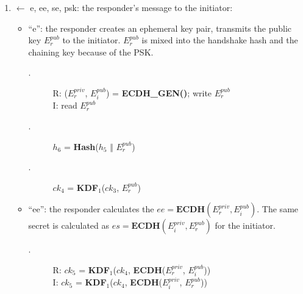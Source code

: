   \begin{enumerate} [start = \value{msg}]
    \item $\leftarrow$ e, ee, se, psk: the responder's message to the initiator:
    \addtocounter{msg}{1}
    \begin{itemize}
      \item ``e'': the responder creates an ephemeral key pair, transmits the public key
      $E^{pub}_r$ to the initiator. $E^{pub}_r$ is mixed into the handshake hash and the chaining
      key because of the PSK.
      \begin{center}
        \begin{varwidth}{\textwidth}
          \begin{description}
          \item[\textnormal{}.] R: ($E^{priv}_r$, $E^{pub}_i$) = \textbf{ECDH{\_}GEN()}; write $E^{pub}_r$ \\
                I:  read $E^{pub}_r$
          \addtocounter{cnt}{1}
          \item[\textnormal{}.] $h_6$ = \textbf{Hash}($h_5$ $\Vert$ $E^{pub}_r$)
          \addtocounter{cnt}{1}
          \item[\textnormal{}.] $ck_4$ = \textbf{KDF}$_1$($ck_3$, $E^{pub}_r$)
          \addtocounter{cnt}{1}
          \end{description}
        \end{varwidth}
      \end{center}
    \item ``ee'':  the responder calculates the $ee = \textbf{ECDH}(E^{priv}_r, E^{pub}_i)$. The
    same secret is calculated as $es = \textbf{ECDH}(E^{priv}_i, E^{pub}_r)$ for the initiator.
      \begin{center}
        \begin{varwidth}{\textwidth}
          \begin{description}
          \item[\textnormal{}.] 
                R: $ck_5$ = \textbf{KDF}$_1$($ck_4$, \textbf{ECDH}($E^{priv}_r$, $E^{pub}_i$)) \\
                I: $ck_5$ = \textbf{KDF}$_1$($ck_4$, \textbf{ECDH}($E^{priv}_i$, $E^{pub}_r$))
          \addtocounter{cnt}{1}
          \end{description}
        \end{varwidth}
      \end{center}


\end{itemize}
\end{enumerate}
